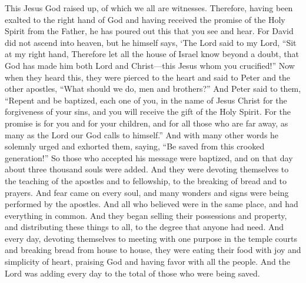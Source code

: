 \begin{biblechapter}
\verse This Jesus God raised up, of which we all are witnesses.
\verse Therefore, having been exalted to the right hand of God and having received the promise of the Holy Spirit from the Father, he has poured out this that you see and hear.
\verse For David did not ascend into heaven, but he himself says,
\verse ‘The Lord said to my Lord, 
“Sit at my right hand,
\verse Therefore let all the house of Israel know beyond a doubt, that God has made him both Lord and Christ—this Jesus whom you crucified!”
 Now when they heard this, they were pierced to the heart and said to Peter and the other apostles, “What should we do, men and brothers?”
\verse And Peter said to them, “Repent and be baptized, each one of you, in the name of Jesus Christ for the forgiveness of your sins, and you will receive the gift of the Holy Spirit.
\verse For the promise is for you and for your children, and for all those who are far away, as many as the Lord our God calls to himself.”
\verse And with many other words he solemnly urged and exhorted them, saying, “Be saved from this crooked generation!”
\verse So those who accepted his message were baptized, and on that day about three thousand souls were added.
 And they were devoting themselves to the teaching of the apostles and to fellowship, to the breaking of bread and to prayers.
\verse And fear came on every soul, and many wonders and signs were being performed by the apostles.
\verse And all who believed were in the same place, and had everything in common.
\verse And they began selling their possessions and property, and distributing these things to all, to the degree that anyone had need.
\verse And every day, devoting themselves to meeting with one purpose in the temple courts and breaking bread from house to house, they were eating their food with joy and simplicity of heart,
\verse praising God and having favor with all the people. And the Lord was adding every day to the total of those who were being saved.
\end{biblechapter}

